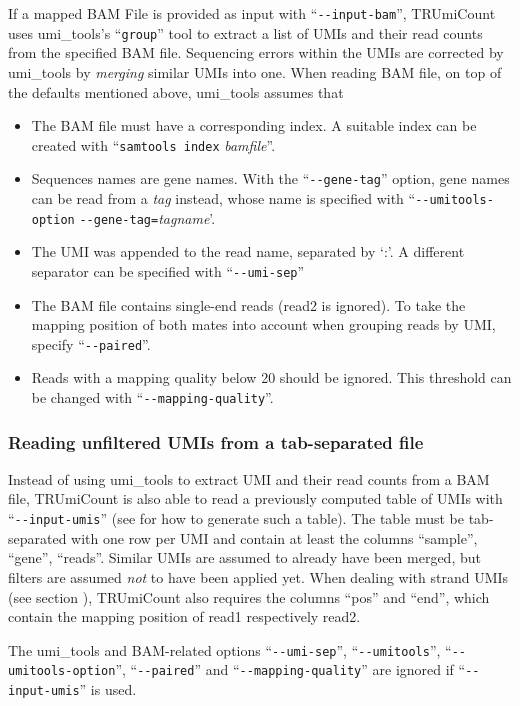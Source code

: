 \documentclass{scrartcl}
\makeatletter
\newcommand{\ddarg}[1]{\texttt{-{}-#1}}
\DeclareRobustCommand*{\nameref}[1]{%
      \textit{\my@nameref{#1}}%
    }%
\makeatother
\begin{document}
If a mapped BAM File is provided as input with ``\ddarg{input-bam}'', TRUmiCount uses umi\_tools's ``\texttt{group}'' tool to extract a list of UMIs and their read counts from the specified BAM file. Sequencing errors within the UMIs are corrected by umi\_tools by \emph{merging} similar UMIs into one. When reading BAM file, on top of the defaults mentioned above, umi\_tools assumes that
\begin{itemize}
  \item The BAM file must have a corresponding index. A suitable index can be created with ``\texttt{samtools index} \textit{bamfile}''.
  \item Sequences names are gene names. With the ``\ddarg{gene-tag}'' option, gene names can be read from a \emph{tag} instead, whose name is specified with ``\ddarg{umitools-option} \allowbreak\ddarg{gene-tag=}\allowbreak\textit{tagname}'.
  \item The UMI was appended to the read name, separated by `:'. A different separator can be specified with ``\ddarg{umi-sep}''
  \item The BAM file contains single-end reads (read2 is ignored). To take the mapping position of both mates into account when grouping reads by UMI, specify ``\ddarg{paired}''.
  \item Reads with a mapping quality below 20 should be ignored. This threshold can be changed with ``\ddarg{mapping-quality}''.
\end{itemize}

\subsubsection*{Reading unfiltered UMIs from a tab-separated file}

Instead of using umi\_tools to extract UMI and their read counts from a BAM file, TRUmiCount is also able to read a previously computed table of UMIs with ``\ddarg{input-umis}'' (see \nameref{output-options} for how to generate such a table). The table must be tab-separated with one row per UMI and contain at least the columns ``sample'', ``gene'', ``reads''. Similar UMIs are assumed to already have been merged, but filters are assumed \emph{not} to have been applied yet. When dealing with strand UMIs (see section \nameref{strand-umis}), TRUmiCount also requires the columns ``pos'' and ``end'', which contain the mapping position of read1 respectively read2.

\begin{sloppypar}
The umi\_tools and BAM-related options ``\ddarg{umi-sep}'', ``\ddarg{umitools}'', ``\ddarg{umitools-option}'', ``\ddarg{paired}'' and ``\ddarg{mapping-quality}'' are ignored if ``\ddarg{input-umis}'' is used.
\end{sloppypar}
\end{document}

